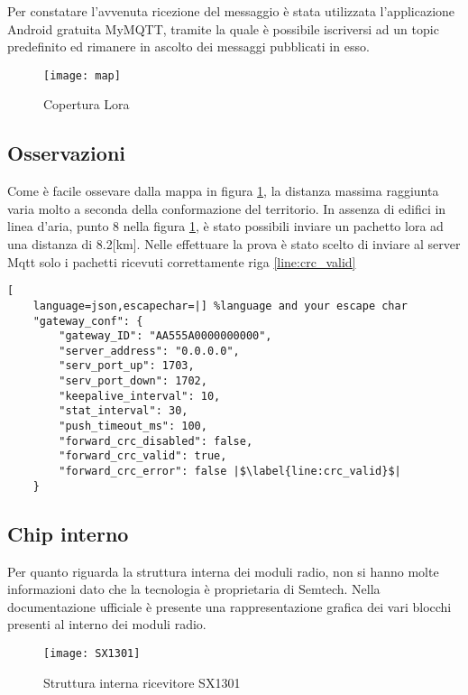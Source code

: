 Per constatare l'avvenuta ricezione del
messaggio è stata utilizzata l'applicazione Android gratuita MyMQTT, tramite la
quale è  possibile iscriversi ad un topic predefinito ed rimanere in ascolto dei
messaggi pubblicati in esso. 

\begin{figure}[h]
\centering 
\texttt{[image: map]}
\caption{Copertura Lora}
\label{fig:map}
\end{figure}

\subsection{Osservazioni}
Come è facile ossevare dalla mappa in figura \ref{fig:map}, la distanza
massima raggiunta varia molto a seconda della conformazione del territorio. In
assenza di edifici in linea d'aria,  punto 8 nella figura \ref{fig:map}, è stato
possibili inviare un pachetto lora ad una distanza di 8.2[km]. Nelle effettuare
la prova è stato scelto di inviare al server Mqtt solo i pachetti ricevuti
correttamente riga \ref{line:crc_valid}
\begin{lstlisting}[
    language=json,escapechar=|] %language and your escape char
    "gateway_conf": {
        "gateway_ID": "AA555A0000000000",
        "server_address": "0.0.0.0",
        "serv_port_up": 1703,
        "serv_port_down": 1702,
        "keepalive_interval": 10,
        "stat_interval": 30,
        "push_timeout_ms": 100,
        "forward_crc_disabled": false,
        "forward_crc_valid": true, 
        "forward_crc_error": false |$\label{line:crc_valid}$|
    }
\end{lstlisting}



\subsection{Chip interno}
Per quanto riguarda la struttura interna dei moduli radio, non si hanno molte
informazioni dato che la tecnologia è proprietaria di Semtech. Nella
documentazione ufficiale è presente una rappresentazione grafica dei vari
blocchi presenti al interno dei moduli radio.

\begin{figure}[h]
\centering 
\texttt{[image: SX1301]}
\caption{Struttura interna ricevitore SX1301}
\label{fig:sx1301}
\end{figure}

